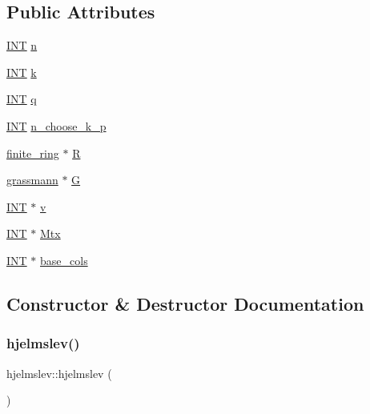 \subsection*{Public Attributes}
\begin{DoxyCompactItemize}
\item 
\mbox{\hyperlink{galois_8h_a09fddde158a3a20bd2dcadb609de11dc}{I\+NT}} \mbox{\hyperlink{classhjelmslev_a585f34e9f542a79e21b9feaa45146489}{n}}
\item 
\mbox{\hyperlink{galois_8h_a09fddde158a3a20bd2dcadb609de11dc}{I\+NT}} \mbox{\hyperlink{classhjelmslev_a1f59d920302f641dcd25451755c917fb}{k}}
\item 
\mbox{\hyperlink{galois_8h_a09fddde158a3a20bd2dcadb609de11dc}{I\+NT}} \mbox{\hyperlink{classhjelmslev_a15076d5718e759582ffaeeff417c4ca1}{q}}
\item 
\mbox{\hyperlink{galois_8h_a09fddde158a3a20bd2dcadb609de11dc}{I\+NT}} \mbox{\hyperlink{classhjelmslev_adcab825e378f663c976860996ca3ca8b}{n\+\_\+choose\+\_\+k\+\_\+p}}
\item 
\mbox{\hyperlink{classfinite__ring}{finite\+\_\+ring}} $\ast$ \mbox{\hyperlink{classhjelmslev_aba7f1127861217a1767e3f0c60e8997d}{R}}
\item 
\mbox{\hyperlink{classgrassmann}{grassmann}} $\ast$ \mbox{\hyperlink{classhjelmslev_af80aa3b9712664949795afb2fca4397a}{G}}
\item 
\mbox{\hyperlink{galois_8h_a09fddde158a3a20bd2dcadb609de11dc}{I\+NT}} $\ast$ \mbox{\hyperlink{classhjelmslev_aaca784320c476c0704c9ea375b02699e}{v}}
\item 
\mbox{\hyperlink{galois_8h_a09fddde158a3a20bd2dcadb609de11dc}{I\+NT}} $\ast$ \mbox{\hyperlink{classhjelmslev_aedb29614299b669317b9cb79ea6eaf1f}{Mtx}}
\item 
\mbox{\hyperlink{galois_8h_a09fddde158a3a20bd2dcadb609de11dc}{I\+NT}} $\ast$ \mbox{\hyperlink{classhjelmslev_a16e9e6eaa2888da760de7e27cb2afb19}{base\+\_\+cols}}
\end{DoxyCompactItemize}


\subsection{Constructor \& Destructor Documentation}
\mbox{\label{classhjelmslev_a6207bcc3398cfd82b8a458577ca521d0}} 
\subsubsection{\texorpdfstring{hjelmslev()}{hjelmslev()}}
{\footnotesize\ttfamily hjelmslev\+::hjelmslev (\begin{DoxyParamCaption}{ }\end{DoxyParamCaption})}

